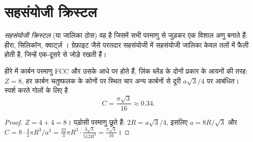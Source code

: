 \section{सहसंयोजी क्रिस्टल}

\begin{definition}[सहसंयोजी क्रिस्टल]\label{def:b1:crystals-ionic-covalent:covalent-crystal}
\emph{सहसंयोजी क्रिस्टल} (या जालिका ठोस) वह
 है जिसमें सभी परमाणु  से जुड़कर एक
विशाल अणु बनाते हैं: हीरा, सिलिकॉन, क्वार्ट्ज़ । ग्रेफ़ाइट जैसे परतदार
सहसंयोजी  में सहसंयोजी जालिका केवल
तलों में फैली होती है, जिन्हें  एक-दूसरे से जोड़े रखती हैं।
\end{definition}

\begin{proposition}[हीरे की संरचना]\label{prop:b1:crystals-ionic-covalent:diamond}
हीरे में कार्बन परमाणु FCC  और उसके आधे
 पर होते हैं, ज़िंक ब्लेंड के दोनों प्रकार के आयनों की तरह: $Z = 8$, हर
कार्बन चतुष्फलक के कोनों पर स्थित चार अन्य कार्बनों से
दूरी $a\sqrt3/4$ पर आबंधित। स्पर्श करते गोलों के लिए  है
\[
  C = \frac{\pi\sqrt3}{16} \approx 0.34 .
\]
\end{proposition}

\begin{proof}
$Z = 4 + 4 = 8$। पड़ोसी परमाणु छूते हैं: $2R = a\sqrt3/4$, इसलिए $a =
8R/\sqrt3$ और $C = 8 \cdot \frac43\pi R^3/a^3 = \frac{32}{3}\pi R^3 \cdot
\frac{3\sqrt3}{512 R^3} = \frac{\pi\sqrt3}{16}$।
\end{proof}

